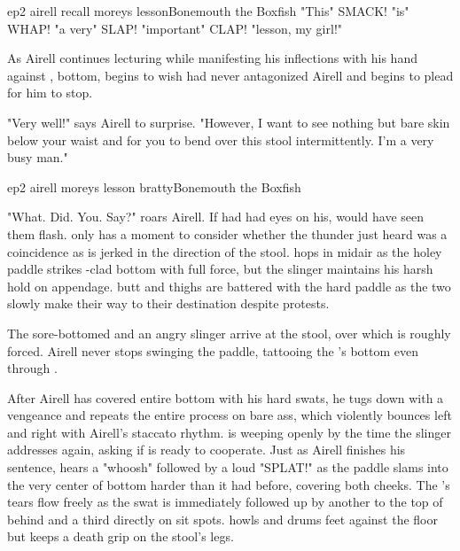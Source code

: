 \documentclass{book}
\begin{document}
\begin{childnode}{ep2 airell recall moreys lesson}{Bonemouth the Boxfish}
"This" SMACK! "is" WHAP! "a very" SLAP! "important" CLAP! "lesson, my girl!" 

As Airell continues lecturing \name{} while manifesting his inflections with his hand against \bumadj{},  bottom, \name{} begins to wish \heshe{} 
had never antagonized Airell and begins to plead for him to stop.

"Very well!" says Airell to \names{} surprise. "However, I want to see nothing but bare skin below your waist and for you to bend over this stool intermittently. I'm a very busy man."


\end{childnode}

\begin{childnode}{ep2 airell moreys lesson bratty}{Bonemouth the Boxfish}

    "What. Did. You. Say?" roars Airell. If \name{} had had \hisher{} eyes on his, \heshe{} would have seen them flash. \HeShe{} only has a moment to consider whether the thunder \heshe{} just heard 
    was a coincidence as \heshe{} is jerked in the direction of the stool. \HeShe{} hops in midair as the holey paddle strikes \hisher{} \trousers{}-clad bottom with full force, but the slinger 
    maintains his harsh hold on \names{} appendage. \names{} \bumadj{} butt and thighs are battered with the hard paddle as the two slowly make their way to their destination despite \names{} 
    protests. 

    The sore-bottomed \boygirl{} and an angry slinger arrive at the stool, over which \name{} is roughly forced. Airell never stops swinging the paddle, tattooing the \boygirl{}'s bottom even 
    through \hisher{} \trousers{} . 

    After Airell has covered \names{} entire \bumadj{} bottom with his hard swats, he tugs \hisher{} \trousers{}  down with a vengeance and repeats the 
    entire process on \hisher{} bare ass, which violently bounces left and right with Airell's staccato rhythm. \name{} is weeping openly by the time the slinger addresses \himher{} again, asking if 
    \heshe is ready to cooperate. Just as Airell finishes his sentence, \name{} hears a "whoosh" followed by a loud "SPLAT!" as the paddle slams into the very center of \hisher{} bottom harder than 
    it had before, covering both cheeks. The \boygirl{}'s tears flow freely as the swat is immediately followed up by another to the top of \hisher{} behind and a third directly on \hisher{} sit 
    spots. \name{} howls and drums \hisher{} feet against the floor but keeps a death grip on the stool's legs. 


\end{childnode}
\end{document}
